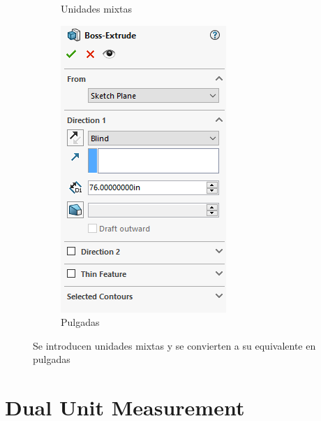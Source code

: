 \documentclass[12pt,letterpaper,final]{report}
\begin{document}
\begin{figure}[H]
\begin{subfigure}[b]{0.35\textwidth}
		\caption{Unidades mixtas}
		\label{fig:solidworksfeetin01}
	\end{subfigure}
	\begin{subfigure}[b]{0.35\textwidth}
		\includegraphics[width=\textwidth]{Imagenes/solidworks_feetin02}
		\caption{Pulgadas}
		\label{fig:solidworksfeetin02}
	\end{subfigure}
	\caption{Se introducen unidades mixtas y se convierten a su equivalente en pulgadas}
\end{figure}

\chapter{Dual Unit Measurement}
\end{document}
